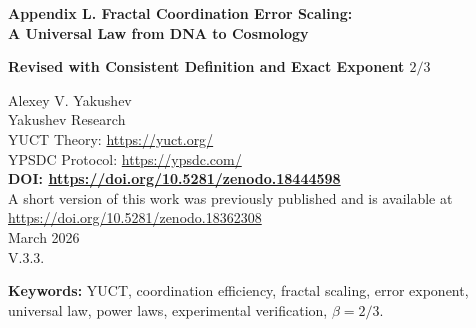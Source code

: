 \documentclass[12pt]{article}
\newcommand{\Keff}{K_{\mathrm{eff}}}
\newcommand{\eps}{\varepsilon}
\newcommand{\kappac}{\kappa_c}
\begin{document}
	
	\begin{titlepage}
		\begin{center}
			\vspace*{1cm}
			\Huge\textbf{Appendix L. Fractal Coordination Error Scaling: \\ A Universal Law from DNA to Cosmology}
			
			\vspace{0.5cm}
			\Large\textbf{Revised with Consistent Definition and Exact Exponent \(2/3\)}
			
			\vspace{1cm}
			\large Alexey V. Yakushev\\
			Yakushev Research\\
			YUCT Theory: \url{https://yuct.org/}\\
			YPSDC Protocol: \url{https://ypsdc.com/}\\
			
			\vspace{2cm}
			\textbf{DOI: \url{https://doi.org/10.5281/zenodo.18444598}}\\
			
			\vspace{1cm}
			\large 
			A short version of this work was previously published and is available at\\ \url{https://doi.org/10.5281/zenodo.18362308}\\
			\vspace{1cm}
			March 2026 \\ \large V.3.3.
			
			\newpage
			\vspace{1cm}
			\begin{abstract}
				This appendix presents a mathematically consistent formulation of a universal scaling law governing coordination errors in complex systems. Within the Yakushev Unified Coordination Theory (YUCT), coordination efficiency \(\Keff\) is defined via information-theoretic ratios following the YPSDC protocol. We show empirically that the relative error \(\eps\) scales as 
				\[
				\eps = \kappac \,\alpha\,\Keff^{-\beta},
				\]
				with exact exponent \(\beta = 2/3\) (empirically \(0.67 \pm 0.03\)) and a universal prefactor \(\kappac = 1/3\). The exponent follows directly from the three-dimensionality of coordination space (Theorem 2 of the main text) and from the requirement that the coordination hierarchy be connected and acyclic (Appendix Y, Section Y.4.2), while \(\kappac\) reflects the minimal residual error due to the triadic structure \(D+I\!\cdot\!R\). The law is tested across more than 50 orders of magnitude -- from atomic bond energies to cosmic microwave background fluctuations -- and explains the origin of power laws (Zipf, allometry, Gutenberg-Richter) within a single framework. Testable predictions for novel systems are formulated, and limitations are explicitly discussed.
			\end{abstract}
			
			\textbf{Keywords:} YUCT, coordination efficiency, fractal scaling, error exponent, universal law, power laws, experimental verification, \(\beta = 2/3\).
		\end{center}
	\end{titlepage}
	
\end{document}
